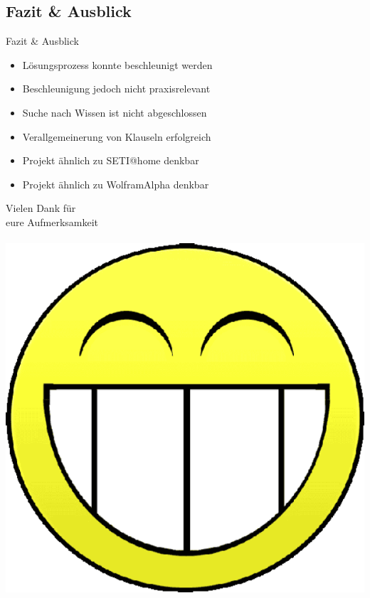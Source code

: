 \documentclass{beamer}
\begin{document}
  \subsection{Fazit \& Ausblick}
    \begin{frame}{Fazit \& Ausblick}
      \begin{itemize}
        \setlength{\itemsep}{12pt}
        \item Lösungsprozess konnte beschleunigt werden
        \pause
        \item Beschleunigung jedoch nicht praxisrelevant
        \pause
        \item Suche nach Wissen ist nicht abgeschlossen
        \pause
        \item Verallgemeinerung von Klauseln erfolgreich
        \pause
        \item Projekt ähnlich zu SETI@home denkbar
        \pause
        \item Projekt ähnlich zu WolframAlpha denkbar
      \end{itemize}
    \end{frame}    

\begin{frame}{}
  \begin{center}
    \begin{LARGE}
      Vielen Dank für\\
      eure Aufmerksamkeit\\
      ~\\
      \includegraphics[scale=0.2]{smilie.png}
    \end{LARGE}
  \end{center}
\end{frame}
\end{document}
